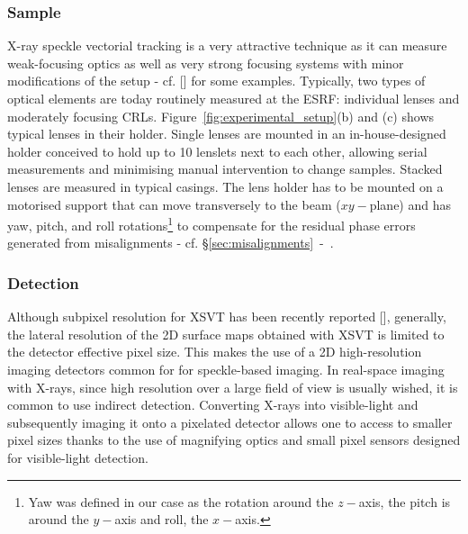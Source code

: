 \begin{refsection}
\subsubsection*{Sample}

X-ray speckle vectorial tracking is a very attractive technique as it can measure weak-focusing optics as well as very strong focusing systems with minor modifications of the setup - cf. [\cite{Berujon2020a}] for some examples. Typically, two types of optical elements are today routinely measured at the ESRF: individual lenses and moderately focusing CRLs. Figure~\ref{fig:experimental_setup}(b) and (c) shows typical lenses in their holder. Single lenses are mounted in an in-house-designed holder conceived to hold up to 10 lenslets next to each other, allowing serial measurements and minimising manual intervention to change samples. Stacked lenses are measured in typical casings. The lens holder has to be mounted on a motorised support that can move transversely to the beam ($xy-$plane) and has yaw, pitch, and roll rotations\footnote{Yaw was defined in our case as the rotation around the $z-$axis, the pitch is around the $y-$axis and roll, the $x-$axis.} to compensate for the residual phase errors generated from misalignments - cf. \S\ref{sec:misalignments}~-~\textit{}. 

\subsubsection*{Detection}

Although subpixel resolution for XSVT has been recently reported [\cite{Qiao2020b}], generally, the lateral resolution of the 2D surface maps obtained with XSVT is limited to the detector effective pixel size. This makes the use of a 2D high-resolution imaging detectors common for for speckle-based imaging. In real-space imaging with X-rays, since high resolution over a large field of view is usually wished, it is common to use indirect detection. Converting X-rays into visible-light and subsequently imaging it onto a pixelated detector allows one to access to smaller pixel sizes thanks to the use of magnifying optics and small pixel sensors designed for visible-light detection.


\end{refsection}

